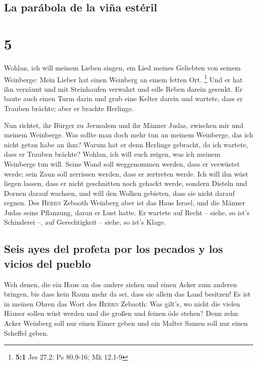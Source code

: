 \hypertarget{la-paruxe1bola-de-la-viuxf1a-estuxe9ril}{%
\subsection{La parábola de la viña
estéril}\label{la-paruxe1bola-de-la-viuxf1a-estuxe9ril}}

\hypertarget{section-4}{%
\section{5}\label{section-4}}

 Wohlan, ich will meinem Lieben singen, ein Lied meines
Geliebten von seinem Weinberge: Mein Lieber hat einen Weinberg an einem
fetten Ort. \footnote{\textbf{5:1} Jes 27,2; Ps 80,9-16; Mk 12,1-9}
 Und er hat ihn verzäunt und mit Steinhaufen verwahrt und
edle Reben darein gesenkt. Er baute auch einen Turm darin und grub eine
Kelter darein und wartete, dass er Trauben brächte; aber er brachte
Herlinge.

 Nun richtet, ihr Bürger zu Jerusalem und ihr Männer
Judas, zwischen mir und meinem Weinberge.  Was sollte man
doch mehr tun an meinem Weinberge, das ich nicht getan habe an ihm?
Warum hat er denn Herlinge gebracht, da ich wartete, dass er Trauben
brächte?  Wohlan, ich will euch zeigen, was ich meinem
Weinberge tun will. Seine Wand soll weggenommen werden, dass er
verwüstet werde; sein Zaun soll zerrissen werden, dass er zertreten
werde.  Ich will ihn wüst liegen lassen, dass er nicht
geschnitten noch gehackt werde, sondern Disteln und Dornen darauf
wachsen, und will den Wolken gebieten, dass sie nicht darauf regnen.
 Des \textsc{Herrn} Zebaoth Weinberg aber ist das Haus
Israel, und die Männer Judas seine Pflanzung, daran er Lust hatte. Er
wartete auf Recht -- siehe, so ist's Schinderei --, auf Gerechtigkeit --
siehe, so ist's Klage.

\hypertarget{seis-ayes-del-profeta-por-los-pecados-y-los-vicios-del-pueblo}{%
\subsection{Seis ayes del profeta por los pecados y los vicios del
pueblo}\label{seis-ayes-del-profeta-por-los-pecados-y-los-vicios-del-pueblo}}

 Weh denen, die ein Haus an das andere ziehen und einen
Acker zum anderen bringen, bis dass kein Raum mehr da sei, dass sie
allein das Land besitzen!  Es ist in meinen Ohren das Wort
des \textsc{Herrn} Zebaoth: Was gilt's, wo nicht die vielen Häuser
sollen wüst werden und die großen und feinen öde stehen? 
Denn zehn Acker Weinberg soll nur einen Eimer geben und ein Malter Samen
soll nur einen Scheffel geben.

